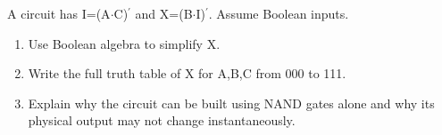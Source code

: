 \documentclass[11pt]{article}
\begin{document}
\begin{keepsection}
\begin{keepsection}
A circuit has I=(A\ensuremath{\cdot}C)\ensuremath{{}^{\prime}} and X=(B\ensuremath{\cdot}I)\ensuremath{{}^{\prime}}. Assume Boolean inputs.

\begin{enumerate}
\item Use Boolean algebra to simplify X.
\item Write the full truth table of X for A,B,C from 000 to 111.
\item Explain why the circuit can be built using NAND gates alone and why its physical output may not change instantaneously.
\end{enumerate}

\end{keepsection}
\end{keepsection}
\end{document}
